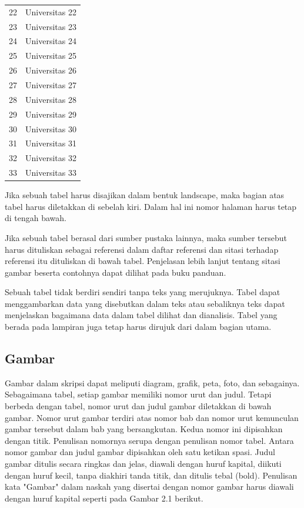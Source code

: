 \begin{longtable}{cl}
      22 & Universitas 22 \\
      23 & Universitas 23 \\
      24 & Universitas 24 \\
      25 & Universitas 25 \\
      26 & Universitas 26 \\
      27 & Universitas 27 \\
      28 & Universitas 28 \\
      29 & Universitas 29 \\
      30 & Universitas 30 \\
      31 & Universitas 31 \\
      32 & Universitas 32 \\
      33 & Universitas 33 \\
      \hline
  \end{longtable}

Jika sebuah tabel harus disajikan dalam bentuk landscape, maka bagian atas tabel harus diletakkan di sebelah kiri. Dalam hal ini nomor halaman harus tetap di tengah bawah.   

Jika sebuah tabel berasal dari sumber pustaka lainnya, maka sumber tersebut harus dituliskan sebagai referensi dalam daftar referensi dan sitasi terhadap referensi itu dituliskan di bawah tabel. Penjelasan lebih lanjut tentang sitasi gambar beserta contohnya dapat dilihat pada buku panduan. 

Sebuah tabel tidak berdiri sendiri tanpa teks yang merujuknya. Tabel dapat menggambarkan data yang disebutkan dalam teks atau sebaliknya teks dapat menjelaskan bagaimana data dalam tabel dilihat dan dianalisis. Tabel yang berada pada lampiran juga tetap harus dirujuk dari dalam bagian utama.

\subsection{Gambar}

Gambar dalam skripsi dapat meliputi diagram, grafik, peta, foto, dan sebagainya. Sebagaimana tabel, setiap gambar memiliki nomor urut dan judul. Tetapi berbeda dengan tabel, nomor urut dan judul gambar diletakkan di bawah gambar. Nomor urut gambar terdiri atas nomor bab dan nomor urut kemunculan gambar tersebut dalam bab yang bersangkutan. Kedua nomor ini dipisahkan dengan titik. Penulisan nomornya serupa dengan penulisan nomor tabel. Antara nomor gambar dan judul gambar dipisahkan oleh satu ketikan spasi. Judul gambar ditulis secara ringkas dan jelas, diawali dengan huruf kapital, diikuti dengan huruf kecil, tanpa diakhiri tanda titik, dan ditulis tebal (bold). Penulisan kata "Gambar" dalam naskah yang disertai dengan nomor gambar harus diawali dengan huruf kapital seperti pada Gambar  2.1 berikut. 

